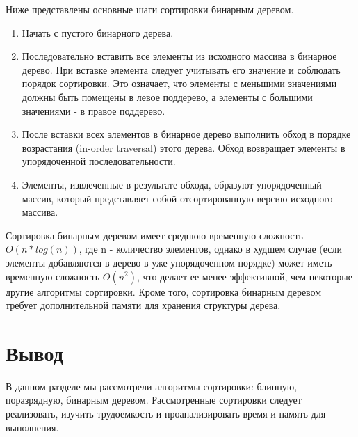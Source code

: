 Ниже представлены основные шаги сортировки бинарным деревом.
\begin{enumerate}
\item Начать с пустого бинарного дерева.
\item Последовательно вставить все элементы из исходного массива в бинарное дерево. 
При вставке элемента следует учитывать его значение и соблюдать порядок сортировки. 
Это означает, что элементы с меньшими значениями должны быть помещены в левое поддерево, а элементы с большими значениями - в правое поддерево.
\item После вставки всех элементов в бинарное дерево выполнить обход в порядке возрастания (in-order traversal) этого дерева. 
Обход возвращает элементы в упорядоченной последовательности.
\item Элементы, извлеченные в результате обхода, образуют упорядоченный массив, который представляет собой отсортированную версию исходного массива.
\end{enumerate}
Сортировка бинарным деревом имеет среднюю временную сложность $O(n*log(n))$, где n - количество элементов, однако в худшем случае (если элементы добавляются в дерево в уже упорядоченном порядке) может иметь временную сложность $O(n^2)$, что делает ее менее эффективной, чем некоторые другие алгоритмы сортировки. 
Кроме того, сортировка бинарным деревом требует дополнительной памяти для хранения структуры дерева.

\section*{Вывод}
В данном разделе мы рассмотрели алгоритмы сортировки: блинную, поразрядную, бинарным деревом.
Рассмотренные сортировки следует реализовать, изучить трудоемкость и проанализировать время и память для выполнения.